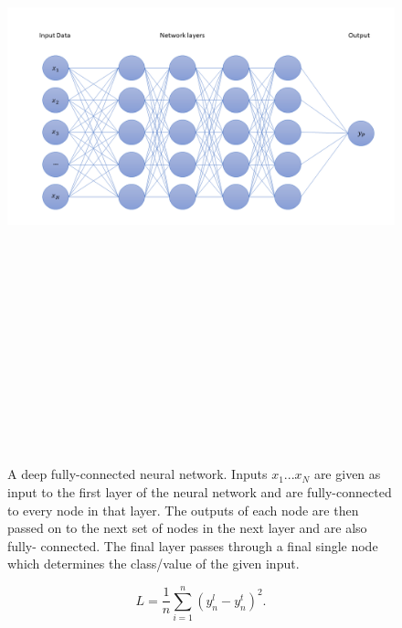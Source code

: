 \begin{figure}
    \centering
    \includegraphics[width=17cm,height=20cm,keepaspectratio]{figures/DeepFullyConnectedNetwork.png}
    \caption{A deep fully-connected neural network. Inputs $x_1 ... x_N$ are given as input to the 
    first layer of the neural network and are fully-connected to every node in that layer. The outputs 
    of each node are then passed on to the next set of nodes in the next layer and are also fully-
    connected. The final layer passes through a final single node which determines the class/value 
    of the given input.}
    \label{fig:deep_nn}
\end{figure}

\begin{equation}
    L = \frac{1}{n} \sum_{i=1}^{n}(y^{l}_n-y^{t}_n)^2.
\end{equation}{}

